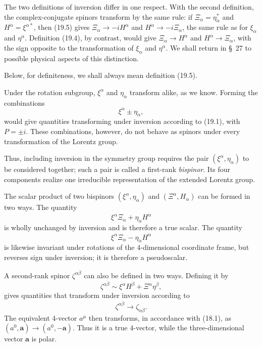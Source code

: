 The two definitions of inversion differ in one respect. With the second definition, the complex-conjugate spinors transform by the same rule: if $\Xi_\alpha=\eta_{\dot\alpha}^*$ and $H^{\dot\alpha}=\xi^{\alpha*}$, then (19.5) gives $\Xi_\alpha\to-iH^{\dot\alpha}$ and $H^{\dot\alpha}\to-i\Xi_\alpha$, the same rule as for $\xi_\alpha$ and $\eta^{\dot\alpha}$. Definition (19.4), by contrast, would give $\Xi_\alpha\to H^{\dot\alpha}$ and $H^{\dot\alpha}\to\Xi_\alpha$, with the sign opposite to the transformation of $\xi_\alpha$ and $\eta^{\dot\alpha}$. We shall return in \S~27 to possible physical aspects of this distinction.

Below, for definiteness, we shall always mean definition (19.5).

Under the rotation subgroup, $\xi^\alpha$ and $\eta_{\dot\alpha}$ transform alike, as we know. Forming the combinations
\begin{equation}
\xi^\alpha\pm\eta_{\dot\alpha},
\tag{19.6}
\end{equation}
would give quantities transforming under inversion according to (19.1), with $P=\pm i$. These combinations, however, do not behave as spinors under every transformation of the Lorentz group.

Thus, including inversion in the symmetry group requires the pair $(\xi^\alpha,\eta_{\dot\alpha})$ to be considered together; such a pair is called a first-rank \emph{bispinor}. Its four components realize one irreducible representation of the extended Lorentz group.

The scalar product of two bispinors $(\xi^\alpha,\eta_{\dot\alpha})$ and $(\Xi^\alpha,H_{\dot\alpha})$ can be formed in two ways. The quantity
\begin{equation}
\xi^\alpha\Xi_\alpha+\eta_{\dot\alpha}H^{\dot\alpha}
\tag{19.7}
\end{equation}
is wholly unchanged by inversion and is therefore a true scalar. The quantity
\begin{equation}
\xi^\alpha\Xi_\alpha-\eta_{\dot\alpha}H^{\dot\alpha}
\tag{19.8}
\end{equation}
is likewise invariant under rotations of the 4-dimensional coordinate frame, but reverses sign under inversion; it is therefore a pseudoscalar.

A second-rank spinor $\zeta^{\alpha\dot\beta}$ can also be defined in two ways. Defining it by
\begin{equation}
\zeta^{\alpha\dot\beta}\sim\xi^\alpha H^{\dot\beta}+\Xi^\alpha\eta^{\dot\beta},
\tag{19.9}
\end{equation}
gives quantities that transform under inversion according to
\begin{equation}
\zeta^{\alpha\dot\beta}\to\zeta_{\dot\alpha\beta}.
\tag{19.10}
\end{equation}
The equivalent 4-vector $a^\mu$ then transforms, in accordance with (18.1), as $(a^0,\mathbf a)\to(a^0,-\mathbf a)$. Thus it is a true 4-vector, while the three-dimensional vector $\mathbf a$ is polar.

